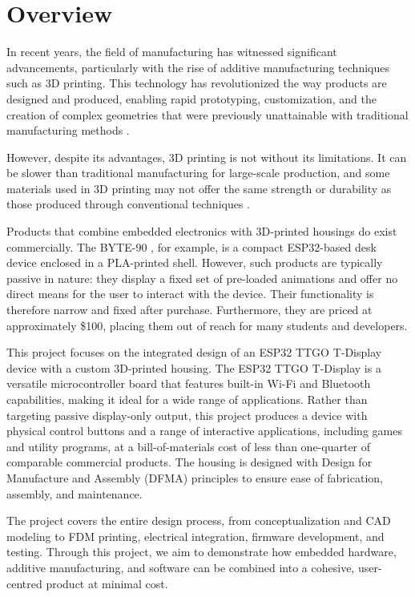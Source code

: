 \section{Overview}

In recent years, the field of manufacturing has witnessed significant advancements, particularly with the rise of additive manufacturing techniques such as 3D printing. This technology has revolutionized the way products are designed and produced, enabling rapid prototyping, customization, and the creation of complex geometries that were previously unattainable with traditional manufacturing methods \cite{3dprinting_review}.

However, despite its advantages, 3D printing is not without its limitations. It can be slower than traditional manufacturing for large-scale production, and some materials used in 3D printing may not offer the same strength or durability as those produced through conventional techniques \cite{3dprinting_pros_cons}.

Products that combine embedded electronics with 3D-printed housings do exist commercially. The BYTE-90 \cite{byte90_alxv}, for example, is a compact ESP32-based desk device enclosed in a PLA-printed shell. However, such products are typically passive in nature: they display a fixed set of pre-loaded animations and offer no direct means for the user to interact with the device. Their functionality is therefore narrow and fixed after purchase. Furthermore, they are priced at approximately \$100, placing them out of reach for many students and developers.

This project focuses on the integrated design of an ESP32 TTGO T-Display device with a custom 3D-printed housing. The ESP32 TTGO T-Display is a versatile microcontroller board that features built-in Wi-Fi and Bluetooth capabilities, making it ideal for a wide range of applications. Rather than targeting passive display-only output, this project produces a device with physical control buttons and a range of interactive applications, including games and utility programs, at a bill-of-materials cost of less than one-quarter of comparable commercial products. The housing is designed with Design for Manufacture and Assembly (DFMA) principles to ensure ease of fabrication, assembly, and maintenance.

The project covers the entire design process, from conceptualization and CAD modeling to FDM printing, electrical integration, firmware development, and testing. Through this project, we aim to demonstrate how embedded hardware, additive manufacturing, and software can be combined into a cohesive, user-centred product at minimal cost.